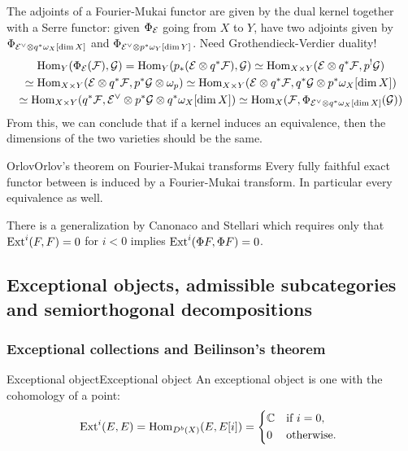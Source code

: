 The adjoints of a Fourier-Mukai functor are given by the dual kernel together with a Serre functor: given $\Phi_{\mathcal{E}}$ going from $X$ to $Y$, have two adjoints given by $\Phi_{\mathcal{E}^\vee\otimes q^*\omega_{X}[\dim X]}$ and $\Phi_{\mathcal{E}^\vee\otimes p^* \omega_{Y}[\dim Y]}$. Need Grothendieck-Verdier duality!
\begin{gather*}
    \operatorname{Hom}_Y(\Phi_{\mathcal{E}}(\mathcal{F}),\mathcal{G})
        = \operatorname{Hom}_Y(p_*(\mathcal{E}\otimes q^*\mathcal{F}),\mathcal{G})
        \simeq \operatorname{Hom}_{X\times Y}(\mathcal{E}\otimes q^*\mathcal{F},p^!\mathcal{G}) \\
        \simeq \operatorname{Hom}_{X\times Y}(\mathcal{E}\otimes q^*\mathcal{F},p^*\mathcal{G}\otimes\omega_p)
        \simeq \operatorname{Hom}_{X\times Y}(\mathcal{E}\otimes q^*\mathcal{F},q^*\mathcal{G}\otimes p^*\omega_X[\dim X]) \\
        \simeq \operatorname{Hom}_{X\times Y}(q^*\mathcal{F},\mathcal{E}^\vee\otimes p^*\mathcal{G}\otimes q^* \omega_X[\dim X])
        \simeq \operatorname{Hom}_X(\mathcal{F},\Phi_{\mathcal{E}^\vee\otimes q^*\omega_X[\dim X]}(\mathcal{G}))
\end{gather*}
From this, we can conclude that if a kernel induces an equivalence, then the dimensions of the two varieties should be the same. 

\begin{theorem}{Orlov}{Orlov's theorem on Fourier-Mukai transforms}
    Every fully faithful exact functor between is induced by a Fourier-Mukai transform. In particular every equivalence as well.
\end{theorem}

There is a generalization by Canonaco and Stellari which requires only that $\operatorname{Ext}^i(F,F)=0$ for $i<0$ implies $\operatorname{Ext}^i(\Phi F,\Phi F)=0$.


\subsection{Exceptional objects, admissible subcategories and semiorthogonal decompositions}

\subsubsection{Exceptional collections and Beilinson's theorem}

\begin{definition}{Exceptional object}{Exceptional object}
    An exceptional object is one with the cohomology of a point:
    \begin{equation*}
        \Ext^i(E,E) = \Hom_{D^b(X)}(E,E[i]) = \begin{cases*}
            \C & if $i=0$, \\
            0 & otherwise.
        \end{cases*}
    \end{equation*}
\end{definition}

